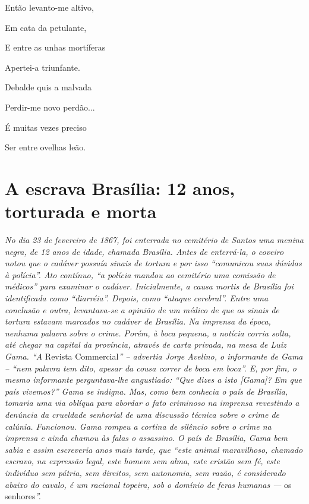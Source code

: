 Então levanto-me altivo,

Em cata da petulante,

E entre as unhas mortíferas

Apertei-a triunfante.

Debalde quis a malvada

Perdir-me novo perdão...

É muitas vezes preciso

Ser entre ovelhas leão.

\part{A escrava Brasília: 12 anos, torturada e morta}

\begin{didascalia}
\emph{No dia 23 de fevereiro de 1867, foi enterrada no cemitério de
Santos uma menina negra, de 12 anos de idade, chamada Brasília. Antes de
enterrá-la, o coveiro notou que o cadáver possuía sinais de tortura e
por isso ``comunicou suas dúvidas à polícia''. Ato contínuo, ``a polícia
mandou ao cemitério uma comissão de médicos'' para examinar o cadáver.
Inicialmente, a causa mortis de Brasília foi identificada como
``diarréia''. Depois, como ``ataque cerebral''. Entre uma conclusão e outra,
levantava-se a opinião de um médico de que os sinais de tortura estavam
marcados no cadáver de Brasília. Na imprensa da época, nenhuma palavra
sobre o crime. Porém, à boca pequena, a notícia corria solta, até chegar
na capital da província, através de carta privada, na mesa de Luiz Gama.
``A} Revista Commercial\emph{'' -- advertia Jorge Avelino, o informante de
Gama -- ``nem palavra tem dito, apesar da cousa correr de boca em boca''.
E, por fim, o mesmo informante perguntava-lhe angustiado: ``Que dizes a
isto {[}Gama{]}? Em que país vivemos?'' Gama se indigna. Mas, como bem
conhecia o país de Brasília, tomaria uma via oblíqua para abordar o fato
criminoso na imprensa revestindo a denúncia da crueldade senhorial de
uma discussão técnica sobre o crime de calúnia. Funcionou. Gama rompeu a
cortina de silêncio sobre o crime na imprensa e ainda chamou às falas o
assassino. O país de Brasília, Gama bem sabia e assim escreveria anos
mais tarde, que ``este animal maravilhoso, chamado escravo, na expressão
legal, este homem sem alma, este cristão sem fé, este indivíduo sem
pátria, sem direitos, sem autonomia, sem razão, é considerado abaixo do
cavalo, é um racional topeira, sob o domínio de feras humanas ---} os
senhores\emph{''.}
\end{didascalia}

